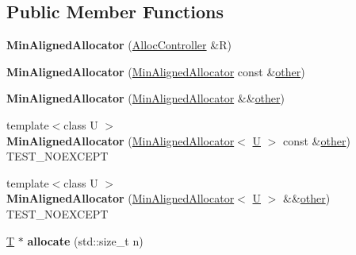 \subsection*{Public Member Functions}
\begin{DoxyCompactItemize}
\item 
\mbox{\label{class_min_aligned_allocator_a84af14cc2f5cb8fa1c79c8198a1645c5}} 
{\bfseries Min\+Aligned\+Allocator} (\mbox{\hyperlink{struct_alloc_controller}{Alloc\+Controller}} \&R)
\item 
\mbox{\label{class_min_aligned_allocator_a48ea0153df77ea3e4cbaf33a38090ef3}} 
{\bfseries Min\+Aligned\+Allocator} (\mbox{\hyperlink{class_min_aligned_allocator}{Min\+Aligned\+Allocator}} const \&\mbox{\hyperlink{structother}{other}})
\item 
\mbox{\label{class_min_aligned_allocator_a3e622965fb3b181c7272304c360609f2}} 
{\bfseries Min\+Aligned\+Allocator} (\mbox{\hyperlink{class_min_aligned_allocator}{Min\+Aligned\+Allocator}} \&\&\mbox{\hyperlink{structother}{other}})
\item 
\mbox{\label{class_min_aligned_allocator_afa6b3eb3fceef175f90cedc77842732e}} 
{\footnotesize template$<$class U $>$ }\\{\bfseries Min\+Aligned\+Allocator} (\mbox{\hyperlink{class_min_aligned_allocator}{Min\+Aligned\+Allocator}}$<$ \mbox{\hyperlink{union_u}{U}} $>$ const \&\mbox{\hyperlink{structother}{other}}) T\+E\+S\+T\+\_\+\+N\+O\+E\+X\+C\+E\+PT
\item 
\mbox{\label{class_min_aligned_allocator_a5c20463f18d87da2d288759b8f74b22f}} 
{\footnotesize template$<$class U $>$ }\\{\bfseries Min\+Aligned\+Allocator} (\mbox{\hyperlink{class_min_aligned_allocator}{Min\+Aligned\+Allocator}}$<$ \mbox{\hyperlink{union_u}{U}} $>$ \&\&\mbox{\hyperlink{structother}{other}}) T\+E\+S\+T\+\_\+\+N\+O\+E\+X\+C\+E\+PT
\item 
\mbox{\label{class_min_aligned_allocator_ad3ded196288062dfce120db23764f86a}} 
\mbox{\hyperlink{struct_t}{T}} $\ast$ {\bfseries allocate} (std\+::size\+\_\+t n)
\item 

\end{DoxyCompactItemize}
